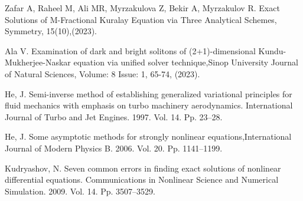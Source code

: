 \documentclass[12pt]{llncs}
\begin{document}
\begin{thebibliography}{9} %
	 Zafar A, Raheel M, Ali MR, Myrzakulova Z, Bekir A, Myrzakulov R. Exact Solutions of M-Fractional Kuralay Equation via Three Analytical Schemes, Symmetry, 15(10),(2023).






		 Ala V.
 Examination of dark and bright solitons of (2+1)-dimensional Kundu-Mukherjee-Naskar equation via unified solver technique,Sinop University Journal of Natural Sciences, Volume: 8 Issue: 1, 65-74,
 (2023).



He, J.   Semi-inverse method of establishing generalized variational principles for fluid mechanics with emphasis on turbo machinery aerodynamics. International Journal of Turbo and Jet Engines. 1997.  Vol. {14}. Pp. 23--28.


He, J.  Some asymptotic methods for strongly nonlinear equations,International Journal of Modern Physics B. 2006. Vol. {20}. Pp. 1141--1199.


Kudryashov, N.  Seven common errors in finding exact solutions of nonlinear differential equations. Communications in Nonlinear Science and Numerical Simulation. 2009. Vol. {14}. Pp. 3507--3529.







\end{thebibliography}
\end{document}
